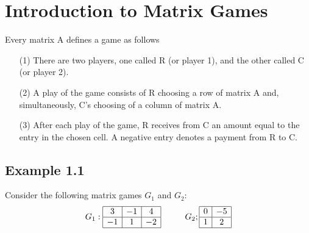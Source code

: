 \documentclass[]{report}
\begin{document}
\section{Introduction to Matrix Games}
Every matrix A defines a game as follows
\begin{itemize}
\item[(1)] There are two players, one called R (or player 1), and the other called C (or player 2).
\item[(2)] A play of the game consists of R choosing a row of matrix A and, simultaneously, C's choosing of a column of matrix A.
\item[(3)] After each play of the game, R receives from C an amount equal to the entry in the chosen cell. A negative entry denotes a payment from R to C.

\end{itemize}
\subsection{Example 1.1}
Consider the following matrix games $G_1$ and $G_2$: 
\[ G_1 :  \begin{array}{|c|c|c|} \hline
3 & -1 & 4 \\ \hline 
-1 & 1  & -2 \\ \hline
\end{array} \;\;\;\qquad
G_2 ; \begin{array}{|c|c|} \hline
0  & -5 \\ \hline
1  & 2  \\ \hline
\end{array}\]
\end{document}
